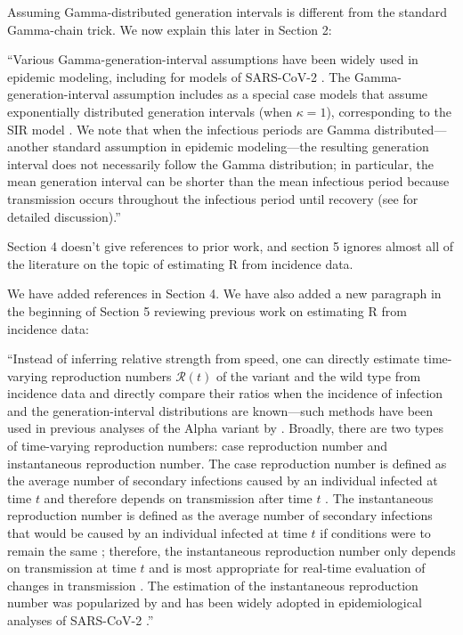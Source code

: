 \documentclass[12pt]{article}
\newcommand{\RR}{\ensuremath{{\mathcal R}}\xspace}
\newcommand{\revtext}{\textsf}
\begin{document}
Assuming Gamma-distributed generation intervals is different from the standard Gamma-chain trick. We now explain this later in Section 2:

``Various Gamma-generation-interval assumptions have been widely used in epidemic modeling, including for models of SARS-CoV-2 \citep{doi:10.1098/rsif.2020.0144}.
The Gamma-generation-interval assumption includes as a special case models that assume exponentially distributed generation intervals (when $\kappa=1$), corresponding to the SIR model \citep{anderson1991infectious}.
We note that when the infectious periods are Gamma distributed---another standard assumption in epidemic modeling---the resulting generation interval does not necessarily follow the Gamma distribution;
in particular, the mean generation interval can be shorter than the mean infectious period because transmission occurs throughout the infectious period until recovery (see \cite{roberts2007model} for detailed discussion).''

\revtext{Section 4 doesn't give references to prior work, and section 5 ignores almost all of the literature on the topic of estimating R from incidence data.}

We have added references in Section 4.
We have also added a new paragraph in the beginning of Section 5 reviewing previous work on estimating R from incidence data:

``Instead of inferring relative strength from speed, one can directly estimate time-varying reproduction numbers $\RR(t)$ of the variant and the wild type from incidence data and directly compare their ratios when the incidence of infection and the generation-interval distributions are known---such methods have been used in previous analyses of the Alpha variant by \cite{volz2021transmission}.
Broadly, there are two types of time-varying reproduction numbers: case reproduction number and instantaneous reproduction number.
The case reproduction number is defined as the average number of secondary infections caused by an individual infected at time $t$ and therefore depends on transmission after time $t$ \citep{wallinga2004different}.
The instantaneous reproduction number is defined as the average number of secondary infections that would be caused by an individual infected at time $t$ if conditions were to remain the same \citep{fraser2007estimating}; 
therefore, the instantaneous reproduction number only depends on transmission at time $t$ and is most appropriate for real-time evaluation of changes in transmission \citep{gostic2020practical}.
The estimation of the instantaneous reproduction number was popularized by \cite{cori2013new} and has been widely adopted in epidemiological analyses of SARS-CoV-2 \citep{abbott2020estimating,knight2020estimating,flaxman2020Rt,brauner2021inferring,li2021temporal}.''
\end{document}
